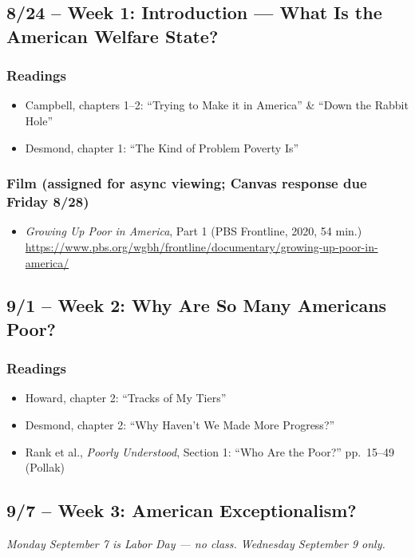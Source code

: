 \documentclass[12pt]{article}
\begin{document}
\subsection*{8/24 -- Week 1: Introduction --- What Is the American Welfare State?}
    \subsubsection*{Readings}
        \begin{itemize}
            \item Campbell, chapters 1--2: ``Trying to Make it in America'' \& ``Down the Rabbit Hole''
            \item Desmond, chapter 1: ``The Kind of Problem Poverty Is''
        \end{itemize}
    \subsubsection*{Film (assigned for async viewing; Canvas response due Friday 8/28)}
        \begin{itemize}
            \item \emph{Growing Up Poor in America}, Part 1 (PBS Frontline, 2020, 54 min.) \\
            \url{https://www.pbs.org/wgbh/frontline/documentary/growing-up-poor-in-america/}
        \end{itemize}

\subsection*{9/1 -- Week 2: Why Are So Many Americans Poor?}
    \subsubsection*{Readings}
        \begin{itemize}
            \item Howard, chapter 2: ``Tracks of My Tiers''
            \item Desmond, chapter 2: ``Why Haven't We Made More Progress?''
            \item Rank et al., \emph{Poorly Understood}, Section 1: ``Who Are the Poor?'' pp.\ 15--49 (Pollak)
        \end{itemize}

\subsection*{9/7 -- Week 3: American Exceptionalism?}
\emph{Monday September 7 is Labor Day --- no class. Wednesday September 9 only.}
\end{document}

